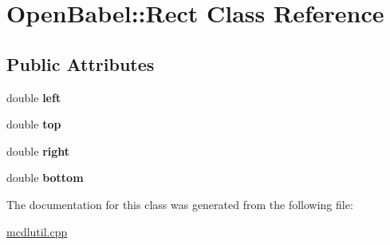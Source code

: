 \hypertarget{class_open_babel_1_1_rect}{\section{Open\-Babel\-:\-:Rect Class Reference}
\label{class_open_babel_1_1_rect}
}
\subsection*{Public Attributes}
\begin{DoxyCompactItemize}
\item 
\hypertarget{class_open_babel_1_1_rect_a0b6639ffb2d066c17af317bfff3bf108}{double {\bfseries left}}\label{class_open_babel_1_1_rect_a0b6639ffb2d066c17af317bfff3bf108}

\item 
\hypertarget{class_open_babel_1_1_rect_a43d7cc257d6ca309237365443aa8ab58}{double {\bfseries top}}\label{class_open_babel_1_1_rect_a43d7cc257d6ca309237365443aa8ab58}

\item 
\hypertarget{class_open_babel_1_1_rect_a2b70e1789d209e610c5f9caef6243a01}{double {\bfseries right}}\label{class_open_babel_1_1_rect_a2b70e1789d209e610c5f9caef6243a01}

\item 
\hypertarget{class_open_babel_1_1_rect_a7f079ec29fa651174a20ddf336cfba7f}{double {\bfseries bottom}}\label{class_open_babel_1_1_rect_a7f079ec29fa651174a20ddf336cfba7f}

\end{DoxyCompactItemize}


The documentation for this class was generated from the following file\-:\begin{DoxyCompactItemize}
\item 
\hyperlink{mcdlutil_8cpp}{mcdlutil.\-cpp}\end{DoxyCompactItemize}
